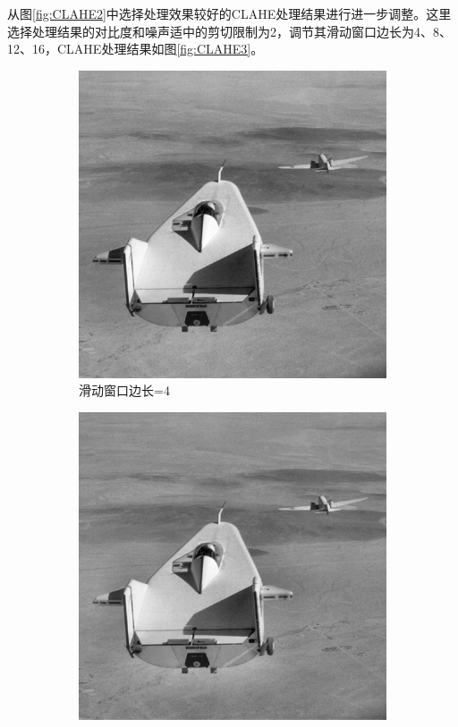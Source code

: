 \documentclass[a4paper]{ctexart}
\newcommand{\outwfour}{0.23\textwidth}
\begin{document}
\begin{spacing}{1.35}
	从图\ref{fig:CLAHE2}中选择处理效果较好的CLAHE处理结果进行进一步调整。这里选择处理结果的对比度和噪声适中的剪切限制为2，调节其滑动窗口边长为4、8、12、16，CLAHE处理结果如图\ref{fig:CLAHE3}。
	\begin{figure}[htbp]
		\centering
		\begin{subfigure}[t]{\outwfour}
			\centering
			\includegraphics[width=\textwidth]{figure/1_tile_grid_size_4.png}
			\caption{滑动窗口边长=4}
		\end{subfigure}
		\begin{subfigure}[t]{\outwfour}
			\centering
			\includegraphics[width=\textwidth]{figure/1_tile_grid_size_8.png}

\end{subfigure}
\end{figure}
\end{spacing}
\end{document}
